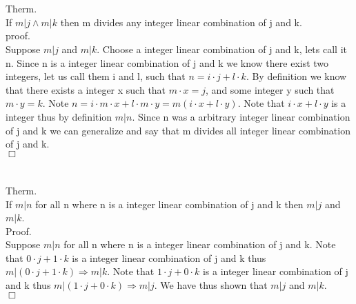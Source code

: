 \documentclass[12pt,a4paper]{article}
\begin{document}
\section{}
Therm.\\
If $m|j\wedge m|k$ then m divides any integer linear combination of j and k.\\
proof.\\
Suppose $m|j$ and $m|k$.  Choose a integer linear combination of j and k, lets call it n.  Since n is a integer linear combination of j and k we know there exist two integers, let us call them i and l, such that $n=i\cdot j+l\cdot k$.  By definition we know that there exists a integer x such that $m\cdot x=j$, and some integer y such that $m\cdot y=k$.  Note  $n=i\cdot m\cdot x+l\cdot m\cdot y=m(i\cdot x+l\cdot y)$.  Note that $i\cdot x+l\cdot y$ is a integer thus by definition $m|n$.  Since n was a arbitrary integer linear combination of j and k we can generalize and say that m divides all integer linear combination of j and k.\\$\Box$

\section{}
Therm.\\
If $m|n$ for all n where n is a integer linear combination of j and k then $m|j$ and $m|k$.\\
Proof.\\
Suppose $m|n$ for all n where n is a integer linear combination of j and k.  Note that $0\cdot j+1\cdot k$ is a integer linear combination of j and k thus $m|(0\cdot j+1\cdot k)\Rightarrow m|k$.  Note that $1\cdot j+0\cdot k$ is a integer linear combination of j and k thus $m|(1\cdot j+0\cdot k)\Rightarrow m|j$.  We have thus shown that $m|j$ and $m|k$.\\$\Box$
\end{document}
